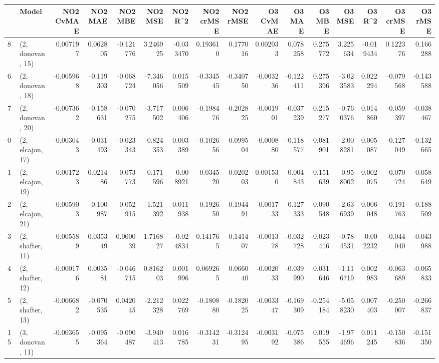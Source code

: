 \begin{tabular}{llrrrrrrrrrrrrrr}
\toprule
{} &             Model &  NO2 CvMAE &   NO2 MAE &   NO2 MBE &    NO2 MSE &   NO2 R\textasciicircum2 &  NO2 crMSE &  NO2 rMSE &  O3 CvMAE &    O3 MAE &    O3 MBE &     O3 MSE &    O3 R\textasciicircum2 &  O3 crMSE &   O3 rMSE \\
\midrule
8  &  (2, donovan, 15) &   0.007197 &  0.062805 & -0.121776 &   3.246925 & -0.033470 &   0.193610 &  0.177016 &  0.002033 &  0.078258 &  0.275772 &   3.225634 & -0.019434 &  0.122376 &  0.166288 \\
6  &  (2, donovan, 18) &  -0.005968 & -0.119303 & -0.068724 &  -7.346056 &  0.015509 &  -0.334545 & -0.340750 & -0.003236 & -0.122411 &  0.275396 &  -3.023583 &  0.022294 & -0.079568 & -0.143588 \\
7  &  (2, donovan, 20) &  -0.007362 & -0.158631 & -0.070275 &  -3.717502 &  0.006406 &  -0.198476 & -0.202825 & -0.001901 & -0.037239 &  0.215277 &  -0.760376 &  0.014860 & -0.059397 & -0.038467 \\
0  &  (2, elcajon, 17) &  -0.003043 & -0.031493 & -0.023343 &  -0.824353 &  0.003389 &  -0.102656 & -0.099504 & -0.000880 & -0.118577 & -0.081901 &  -2.008281 &  0.005087 & -0.127049 & -0.132665 \\
1  &  (2, elcajon, 19) &   0.001723 &  0.021486 & -0.073773 &  -0.171596 & -0.008921 &  -0.034520 & -0.020203 &  0.001530 & -0.004843 &  0.151639 &  -0.958002 &  0.002075 & -0.070724 & -0.058649 \\
2  &  (2, elcajon, 21) &  -0.005903 & -0.100987 & -0.052915 &  -1.521392 &  0.011938 &  -0.192650 & -0.194491 & -0.001733 & -0.127333 & -0.090548 &  -2.636939 &  0.006048 & -0.191763 & -0.188509 \\
3  &  (2, shafter, 11) &   0.005589 &  0.035349 &  0.000039 &   1.716827 & -0.024834 &   0.141765 &  0.141407 & -0.001378 & -0.032728 & -0.023416 &  -0.784531 & -0.002232 & -0.044040 & -0.043988 \\
4  &  (2, shafter, 12) &  -0.000176 &  0.003581 & -0.046715 &   0.816203 &  0.001996 &   0.069265 &  0.066040 & -0.002033 & -0.039990 &  0.031646 &  -1.116719 &  0.002983 & -0.063689 & -0.065833 \\
5  &  (2, shafter, 13) &  -0.006682 & -0.070535 &  0.042045 &  -2.212328 &  0.022769 &  -0.180880 & -0.182025 & -0.003347 & -0.169309 & -0.254184 &  -5.058230 &  0.007403 & -0.250007 & -0.266837 \\
15 &  (3, donovan, 11) &  -0.003655 & -0.095364 & -0.090487 &  -3.940413 &  0.016785 &  -0.314231 & -0.312495 & -0.003192 & -0.075386 &  0.019555 &  -1.974696 &  0.011245 & -0.150836 & -0.151350 \\

\end{tabular}
